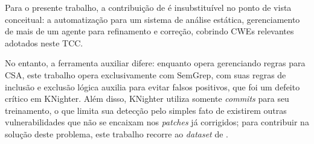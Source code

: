 \documentclass[
    12pt,                %
    openright,           %
    oneside,             %
    a4paper,             %
    english,             %
    brazil               %
]{abntex2}
\begin{document}
\par
Para o presente trabalho, a contribuição de  é insubstituível no ponto de vista conceitual: a automatização para um sistema de análise estática, gerenciamento de mais de um agente para refinamento e correção, cobrindo CWEs relevantes adotados neste TCC.
\par
No entanto, a ferramenta auxiliar difere: enquanto  opera gerenciando regras para CSA, este trabalho opera exclusivamente com SemGrep, com suas regras de inclusão e exclusão lógica auxilia para evitar falsos positivos, que foi um defeito crítico em KNighter.
Além disso, KNighter utiliza somente \textit{commits} para seu treinamento, o que limita sua detecção pelo simples fato de existirem outras vulnerabilidades que não se encaixam nos \textit{patches} já corrigidos; para contribuir na solução deste problema, este trabalho recorre ao \textit{dataset} de .
\end{document}

